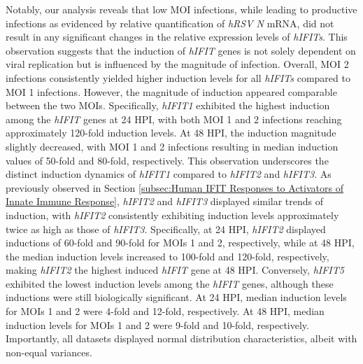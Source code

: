 Notably, our analysis reveals that low MOI infections, while leading to productive infections as evidenced by relative quantification of \textit{hRSV N} mRNA, did not result in any significant changes in the relative expression levels of \textit{hIFITs}. This observation suggests that the induction of \textit{hIFIT} genes is not solely dependent on viral replication but is influenced by the magnitude of infection. Overall, MOI 2 infections consistently yielded higher induction levels for all \textit{hIFITs} compared to MOI 1 infections. However, the magnitude of induction appeared comparable between the two MOIs. Specifically, \textit{hIFIT1} exhibited the highest induction among the \textit{hIFIT} genes at 24 HPI, with both MOI 1 and 2 infections reaching approximately 120-fold induction levels. At 48 HPI, the induction magnitude slightly decreased, with MOI 1 and 2 infections resulting in median induction values of 50-fold and 80-fold, respectively. This observation underscores the distinct induction dynamics of \textit{hIFIT1} compared to \textit{hIFIT2} and \textit{hIFIT3}. As previously observed in Section \ref{subsec:Human IFIT Responses to Activators of Innate Immune Response}, \textit{hIFIT2} and \textit{hIFIT3} displayed similar trends of induction, with \textit{hIFIT2} consistently exhibiting induction levels approximately twice as high as those of \textit{hIFIT3}. Specifically, at 24 HPI, \textit{hIFIT2} displayed inductions of 60-fold and 90-fold for MOIs 1 and 2, respectively, while at 48 HPI, the median induction levels increased to 100-fold and 120-fold, respectively, making \textit{hIFIT2} the highest induced \textit{hIFIT} gene at 48 HPI. Conversely, \textit{hIFIT5} exhibited the lowest induction levels among the \textit{hIFIT} genes, although these inductions were still biologically significant. At 24 HPI, median induction levels for MOIs 1 and 2 were 4-fold and 12-fold, respectively. At 48 HPI, median induction levels for MOIs 1 and 2 were 9-fold and 10-fold, respectively. Importantly, all datasets displayed normal distribution characteristics, albeit with non-equal variances.

